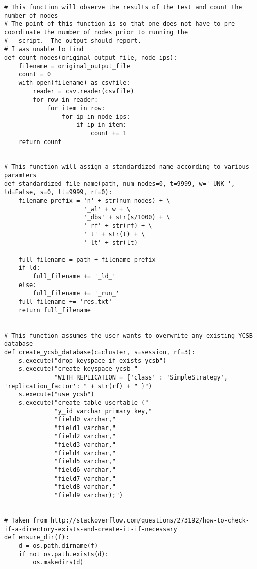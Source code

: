 \begin{verbatim}
# This function will observe the results of the test and count the number of nodes
# The point of this function is so that one does not have to pre-coordinate the number of nodes prior to running the
#   script.  The output should report.
# I was unable to find
def count_nodes(original_output_file, node_ips):
    filename = original_output_file
    count = 0
    with open(filename) as csvfile:
        reader = csv.reader(csvfile)
        for row in reader:
            for item in row:
                for ip in node_ips:
                    if ip in item:
                        count += 1
    return count


# This function will assign a standardized name according to various paramters
def standardized_file_name(path, num_nodes=0, t=9999, w='_UNK_', ld=False, s=0, lt=9999, rf=0):
    filename_prefix = 'n' + str(num_nodes) + \
                      '_wl' + w + \
                      '_dbs' + str(s/1000) + \
                      '_rf' + str(rf) + \
                      '_t' + str(t) + \
                      '_lt' + str(lt)

    full_filename = path + filename_prefix
    if ld:
        full_filename += '_ld_'
    else:
        full_filename += '_run_'
    full_filename += 'res.txt'
    return full_filename


# This function assumes the user wants to overwrite any existing YCSB database
def create_ycsb_database(c=cluster, s=session, rf=3):
    s.execute("drop keyspace if exists ycsb")
    s.execute("create keyspace ycsb "
              "WITH REPLICATION = {'class' : 'SimpleStrategy', 'replication_factor': " + str(rf) + " }")
    s.execute("use ycsb")
    s.execute("create table usertable ("
              "y_id varchar primary key,"
              "field0 varchar,"
              "field1 varchar,"
              "field2 varchar,"
              "field3 varchar,"
              "field4 varchar,"
              "field5 varchar,"
              "field6 varchar,"
              "field7 varchar,"
              "field8 varchar,"
              "field9 varchar);")


# Taken from http://stackoverflow.com/questions/273192/how-to-check-if-a-directory-exists-and-create-it-if-necessary
def ensure_dir(f):
    d = os.path.dirname(f)
    if not os.path.exists(d):
        os.makedirs(d)



\end{verbatim}
